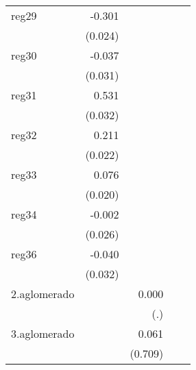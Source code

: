 {\begin{longtable}{l*{4}{D{.}{.}{-1}}}
\addlinespace
reg29       &      -0.301\sym{***}&                     &                     &                     \\
            &     (0.024)         &                     &                     &                     \\
\addlinespace
reg30       &      -0.037         &                     &                     &                     \\
            &     (0.031)         &                     &                     &                     \\
\addlinespace
reg31       &       0.531\sym{***}&                     &                     &                     \\
            &     (0.032)         &                     &                     &                     \\
\addlinespace
reg32       &       0.211\sym{***}&                     &                     &                     \\
            &     (0.022)         &                     &                     &                     \\
\addlinespace
reg33       &       0.076\sym{***}&                     &                     &                     \\
            &     (0.020)         &                     &                     &                     \\
\addlinespace
reg34       &      -0.002         &                     &                     &                     \\
            &     (0.026)         &                     &                     &                     \\
\addlinespace
reg36       &      -0.040         &                     &                     &                     \\
            &     (0.032)         &                     &                     &                     \\
\addlinespace
2.aglomerado&                     &       0.000         &                     &                     \\
            &                     &         (.)         &                     &                     \\
\addlinespace
3.aglomerado&                     &       0.061         &                     &                     \\
            &                     &     (0.709)         &                     &                     \\

\end{longtable}}
